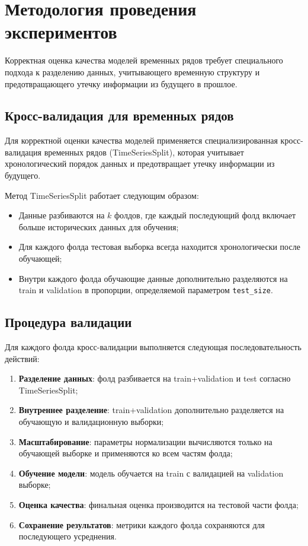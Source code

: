 \section{Методология проведения экспериментов}
\label{sec:experiment_methodology}

\hspace*{1.25cm}Корректная оценка качества моделей временных рядов требует специального подхода к разделению данных, учитывающего временную структуру и предотвращающего утечку информации из будущего в прошлое.

\subsection{Кросс-валидация для временных рядов}

\hspace*{1.25cm}Для корректной оценки качества моделей применяется специализированная кросс-валидация временных рядов (TimeSeriesSplit), которая учитывает хронологический порядок данных и предотвращает утечку информации из будущего.

\hspace*{1.25cm}Метод TimeSeriesSplit работает следующим образом:
\begin{itemize}
	\item Данные разбиваются на $k$ фолдов, где каждый последующий фолд включает больше исторических данных для обучения;
	\item Для каждого фолда тестовая выборка всегда находится хронологически после обучающей;
	\item Внутри каждого фолда обучающие данные дополнительно разделяются на train и validation в пропорции, определяемой параметром \texttt{test\_size}.
\end{itemize}

\subsection{Процедура валидации}

\hspace*{1.25cm}Для каждого фолда кросс-валидации выполняется следующая последовательность действий:
\begin{enumerate}
	\item \textbf{Разделение данных}: фолд разбивается на train+validation и test согласно TimeSeriesSplit;
	\item \textbf{Внутреннее разделение}: train+validation дополнительно разделяется на обучающую и валидационную выборки;
	\item \textbf{Масштабирование}: параметры нормализации вычисляются только на обучающей выборке и применяются ко всем частям фолда;
	\item \textbf{Обучение модели}: модель обучается на train с валидацией на validation выборке;
	\item \textbf{Оценка качества}: финальная оценка производится на тестовой части фолда;
	\item \textbf{Сохранение результатов}: метрики каждого фолда сохраняются для последующего усреднения.
\end{enumerate}

